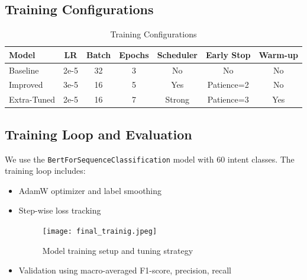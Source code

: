 \documentclass{ecai}
\begin{document}
\subsection{Training Configurations}
\begin{table}[H]
\centering
\caption{Training Configurations}
\begin{tabular}{lcccccc}
\toprule
Model & LR & Batch & Epochs & Scheduler & Early Stop & Warm-up \\
\midrule
Baseline     & 2e-5 & 32 & 3 & No    & No          & No  \\
Improved     & 3e-5 & 16 & 5 & Yes   & Patience=2  & No  \\
Extra-Tuned  & 2e-5 & 16 & 7 & Strong& Patience=3  & Yes \\
\bottomrule
\end{tabular}
\end{table}

\subsection{Training Loop and Evaluation}
We use the \texttt{BertForSequenceClassification} model with 60 intent classes. The training loop includes:
\begin{itemize}
    \item AdamW optimizer and label smoothing
    \item Step-wise loss tracking
    
    \begin{figure}[H]
        \centering
        \texttt{[image: final\_trainig.jpeg]}
        \caption{Model training setup and tuning strategy}
    \end{figure}

    \item Validation using macro-averaged F1-score, precision, recall
\end{itemize}
\end{document}
